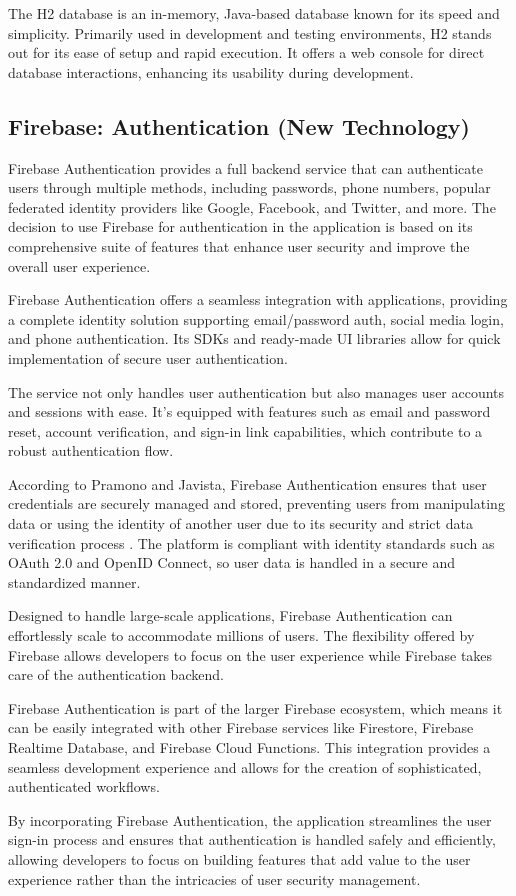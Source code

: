 The H2 database is an in-memory, Java-based database known for its speed and simplicity. 
Primarily used in development and testing environments, H2 stands out for its ease of setup and rapid execution. 
It offers a web console for direct database interactions, enhancing its usability during development.




\subsection{Firebase: Authentication (New Technology)}

Firebase Authentication provides a full backend service that can authenticate users through multiple methods, including passwords, phone numbers, popular federated identity providers like Google, Facebook, and Twitter, and more. The decision to use Firebase for authentication in the application is based on its comprehensive suite of features that enhance user security and improve the overall user experience.

Firebase Authentication offers a seamless integration with applications, providing a complete identity solution supporting email/password auth, social media login, and phone authentication. Its SDKs and ready-made UI libraries allow for quick implementation of secure user authentication.

The service not only handles user authentication but also manages user accounts and sessions with ease. It's equipped with features such as email and password reset, account verification, and sign-in link capabilities, which contribute to a robust authentication flow.

According to Pramono and Javista, Firebase Authentication ensures that user credentials are securely managed and stored, preventing users from manipulating data or using the identity of another user due to its security and strict data verification process \cite{pramono2021firebase}. The platform is compliant with identity standards such as OAuth 2.0 and OpenID Connect, so user data is handled in a secure and standardized manner.

Designed to handle large-scale applications, Firebase Authentication can effortlessly scale to accommodate millions of users. The flexibility offered by Firebase allows developers to focus on the user experience while Firebase takes care of the authentication backend.

Firebase Authentication is part of the larger Firebase ecosystem, which means it can be easily integrated with other Firebase services like Firestore, Firebase Realtime Database, and Firebase Cloud Functions. This integration provides a seamless development experience and allows for the creation of sophisticated, authenticated workflows.

By incorporating Firebase Authentication, the application streamlines the user sign-in process and ensures that authentication is handled safely and efficiently, allowing developers to focus on building features that add value to the user experience rather than the intricacies of user security management.
